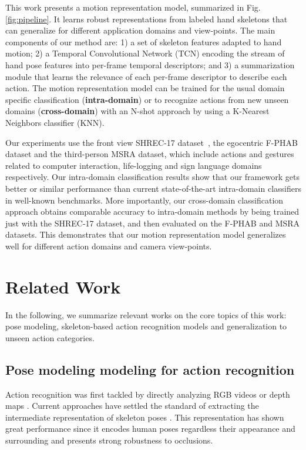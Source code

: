 \documentclass[letterpaper, 10 pt, conference]{ieeeconf}
\begin{document}
This work presents a motion representation model, summarized in Fig. \ref{fig:pipeline}. It learns robust representations from labeled hand skeletons that can generalize for different application domains and view-points. The main components of our method are: 1) a set of skeleton features adapted to hand motion; 2) a Temporal Convolutional Network (TCN) encoding the stream of hand pose features into per-frame temporal descriptors; and 3) a summarization module that learns the relevance of each per-frame descriptor to describe each action.  
The motion representation model can be trained for the usual domain specific classification (\textbf{intra-domain}) or to recognize actions from new unseen domains (\textbf{cross-domain}) with an N-shot approach by using a K-Nearest Neighbors classifier (KNN).






Our experiments use the front view SHREC-17 dataset~\cite{de2017shrec}, the egocentric F-PHAB dataset \cite{garcia2018first} and the third-person MSRA \cite{sun2015cascaded} dataset, which include actions and gestures related to computer interaction, life-logging and sign language domains respectively.
Our intra-domain classification results show that our framework gets better or similar performance than current state-of-the-art intra-domain classifiers in well-known benchmarks. More importantly, our cross-domain classification approach obtains comparable accuracy to intra-domain methods by being trained just with the SHREC-17 dataset, and then evaluated on the F-PHAB and MSRA datasets. This demonstrates that our motion representation model generalizes well for different action domains and camera view-points.











\section{Related Work}





In the following, we summarize relevant works on the core topics of this work: pose modeling, skeleton-based action recognition models and generalization to unseen action categories. 



\subsection{Pose modeling modeling for action recognition}
Action recognition was first tackled by directly analyzing RGB videos \cite{feichtenhofer2016convolutional} or depth maps \cite{oreifej2013hon4d}. Current approaches have settled the standard of extracting the intermediate representation of skeleton poses \cite{zhang2016efficient, yang2019make}. This representation has shown great performance since it encodes human poses regardless their appearance and surrounding and presents strong robustness to occlusions.
 
\end{document}
